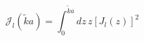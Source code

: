 \begin{equation}
{\mathcal J_{l}} ( \tilde{k} a  )
 = 
\int_{0}^{  \tilde{k} a  } 
d z \, z
 \left[ J_{l} (z) \right]^{2} 
\; 
\label{eq:mathcal_J_integral_def}
\end{equation}

